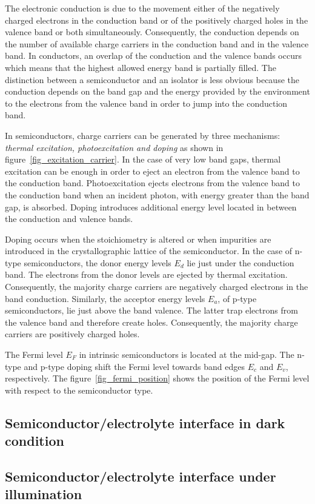 

The electronic conduction is due to the movement either of the negatively 
charged electrons in the conduction band or of the positively charged holes 
in the valence band or both simultaneously. 
Consequently, the conduction depends on the number of available charge carriers
in the conduction band and in the valence band. 
In conductors, an overlap of the conduction and the valence bands occurs 
which means that the highest allowed energy band is partially filled. 
The distinction between a semiconductor and an isolator is less obvious 
because the conduction depends on the band gap and the energy provided by 
the environment to the electrons from the valence band in order to jump 
into the conduction band.

In semiconductors, charge carriers can be generated by three mechanisms: 
\emph{thermal excitation, photoexcitation and doping} as shown in 
figure~\ref{fig_excitation_carrier}. 
In the case of very low band gaps, thermal excitation can be enough in order 
to eject an electron from the valence band to the conduction band. 
Photoexcitation ejects electrons from the valence band to the conduction 
band when an incident photon, with energy greater than the band gap, is absorbed. 
Doping introduces additional energy level located in between the conduction and 
valence bands.

Doping occurs when the stoichiometry is altered or when impurities are 
introduced in the crystallographic lattice of the semiconductor. 
In the case of n-type semiconductors, the donor energy levels $E_d$ lie just 
under the conduction band. The electrons from the donor levels are ejected by 
thermal excitation. 
Consequently, the majority charge carriers are negatively charged electrons 
in the band conduction. 
Similarly, the acceptor energy levels $E_a$, of p-type semiconductors, 
lie just above the band valence. 
The latter trap electrons from the valence band and therefore create holes. 
Consequently, the majority charge carriers are positively charged holes.



The Fermi level $E_F$ in intrinsic semiconductors is located at the mid-gap. 
The n-type and p-type doping shift the Fermi level towards band edges 
$E_c$ and $E_v$, respectively. 
The figure~\ref{fig_fermi_position} shows the position of the Fermi level 
with respect to the semiconductor type.





\subsection{Semiconductor/electrolyte interface in dark condition}




\subsection{Semiconductor/electrolyte interface under illumination}